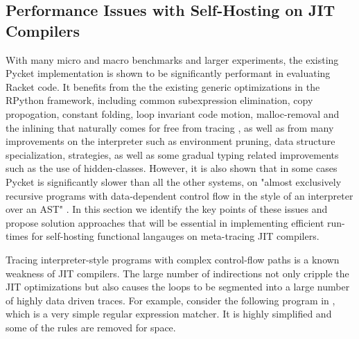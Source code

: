 \vspace{-0.25cm}

\subsection{Performance Issues with Self-Hosting on JIT Compilers}
\label{subsec:performance}

With many micro and macro benchmarks and larger experiments, the
existing Pycket implementation is shown to be significantly performant
in evaluating Racket code. It benefits from the the existing generic
optimizations in the RPython framework, including common subexpression
elimination, copy propogation, constant folding, loop invariant code
motion, malloc-removal and the inlining that naturally comes for free
from tracing \cite{loop-aware:12, hotpath:06, malloc-removal:11}, as
well as from many improvements on the interpreter such as environment
pruning, data structure specialization, strategies, as well as some
gradual typing related improvements such as the use of
hidden-classes. However, it is also shown that in some cases Pycket is
significantly slower than all the other systems, on "almost
exclusively recursive programs with data-dependent control flow in the
style of an interpreter over an AST" \cite{pycket15, pycket17}. In
this section we identify the key points of these issues and propose
solution approaches that will be essential in implementing efficient
run-times for self-hosting functional langauges on meta-tracing JIT
compilers.

Tracing interpreter-style programs with complex control-flow paths is
a known weakness of JIT compilers. The large number of indirections
not only cripple the JIT optimizations but also causes the loops to be
segmented into a large number of highly data driven traces. For
example, consider the following program in , which
is a very simple regular expression matcher. It is highly simplified
and some of the rules are removed for space.

